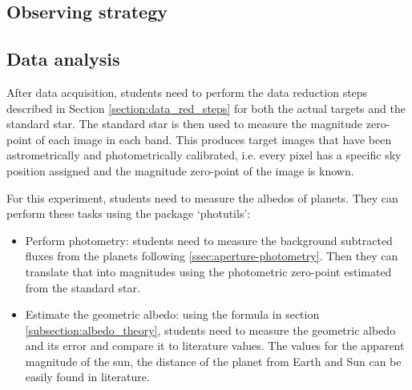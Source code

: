 \documentclass[a4paper, 11pt, fleqn]{memoir}
\begin{document}
\subsection{Observing strategy}

\subsection{Data analysis}

After data acquisition, students need to perform the data reduction steps described in Section \ref{section:data_red_steps} for both the actual targets and the standard star.
The standard star is then used to measure the magnitude zero-point of each image in each band.
This produces target images that have been astrometrically and photometrically calibrated, i.e. every pixel has a specific sky position assigned and the magnitude zero-point of the image is known.

For this experiment, students need to measure the albedos of planets.
They can perform these tasks using the  package `photutils':
\begin{itemize}
    \item Perform photometry: students need to measure the background subtracted fluxes from the planets following \cref{ssec:aperture-photometry}.
          Then they can translate that into magnitudes using the photometric zero-point estimated from the standard star.
    \item
          Estimate the geometric albedo: using the formula in section
          \ref{subsection:albedo_theory}, students need to measure the geometric albedo
          and its error and compare it to literature values.
          The values for the apparent magnitude of the sun, the distance of the planet from Earth and Sun can be easily found in literature.
\end{itemize}




\end{document}
